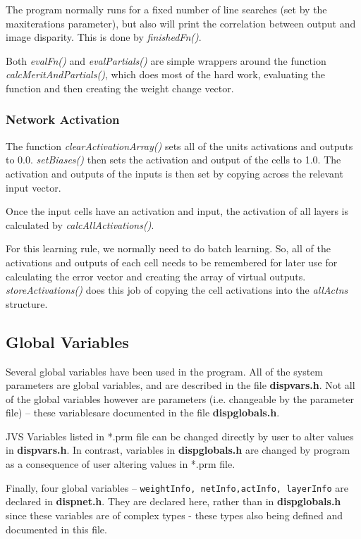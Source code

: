 \documentclass[a4paper]{article}
\begin{document}
The program normally runs for a fixed number of line searches (set by
the maxiterations parameter), but also will print the correlation
between output and image disparity.  This is done by {\em finishedFn()}.

Both {\em evalFn()} and {\em evalPartials()} are simple wrappers around the
function {\em calcMeritAndPartials()}, which does most of the hard work,
evaluating the function and then creating the weight change vector.


\subsubsection*{Network Activation}

The function {\em clearActivationArray()} sets all of the units activations
and outputs to 0.0.  {\em setBiases()} then sets the activation and output
of the cells to 1.0.  The activation and outputs of the inputs is then
set by copying across the relevant input vector.  

Once the input cells have an activation and input, the activation of
all layers is calculated by {\em calcAllActivations()}.

For this learning rule, we normally need to do batch learning.  So,
all of the activations and outputs of each cell needs to be remembered
for later use for calculating the error vector and creating the array
of virtual outputs.  {\em storeActivations()} does this job of copying the
cell activations into the {\em allActns} structure.

\subsection{Global Variables}

Several global variables have been used in the program.  All of the
system parameters are global variables, and are described in the file
{\bf dispvars.h}.  Not all of the global variables however are
parameters (i.e. changeable by the parameter file) -- these
variablesare documented in the file {\bf dispglobals.h}.

JVS Variables listed in *.prm file can be changed directly by user to
alter values in {\bf dispvars.h}.  In contrast, variables in {\bf
dispglobals.h} are changed by program as a consequence of user
altering values in *.prm file.
 
Finally, four global variables -- \texttt{weightInfo, netInfo,actInfo,
layerInfo} are declared in {\bf dispnet.h}.  They are declared here,
rather than in {\bf dispglobals.h} since these variables are of complex
types - these types also being defined and documented in this file.
\end{document}
